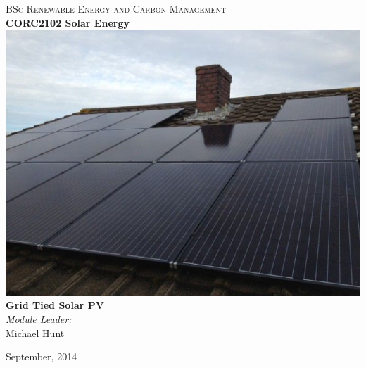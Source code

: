 \documentclass[class=scrartcl, crop=false,parskip=half]{standalone}
\begin{document}
\begin{titlepage}
\vbox{ }

\vbox{ }

\begin{center}
\textsc{\Large BSc Renewable Energy and Carbon Management}\\[0.5cm]
\vbox{ }
{ \huge \bfseries CORC2102 Solar Energy}\\[1.0cm]
\includegraphics[width=1.0\textwidth]{../figures/PVF-4kWp-Bodmin.jpg}\\[1cm]

{ \huge \bfseries Grid Tied Solar PV}\\[1.0cm]


\emph{Module Leader:}\\
Michael Hunt

\vfill
{\large September, 2014}
\end{center}
\end{titlepage}
\end{document}
